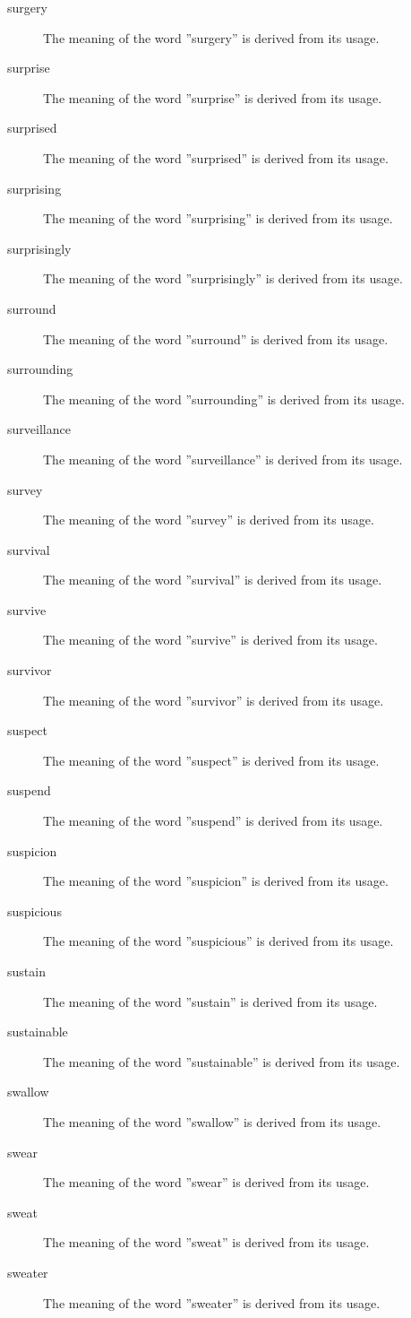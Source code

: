 \documentclass[12pt, letterpaper]{memoir}
\begin{document}
\begin{description}
\item[surgery] The meaning of the word ''surgery'' is derived from its usage.
\item[surprise] The meaning of the word ''surprise'' is derived from its usage.
\item[surprised] The meaning of the word ''surprised'' is derived from its usage.
\item[surprising] The meaning of the word ''surprising'' is derived from its usage.
\item[surprisingly] The meaning of the word ''surprisingly'' is derived from its usage.
\item[surround] The meaning of the word ''surround'' is derived from its usage.
\item[surrounding] The meaning of the word ''surrounding'' is derived from its usage.
\item[surveillance] The meaning of the word ''surveillance'' is derived from its usage.
\item[survey] The meaning of the word ''survey'' is derived from its usage.
\item[survival] The meaning of the word ''survival'' is derived from its usage.
\item[survive] The meaning of the word ''survive'' is derived from its usage.
\item[survivor] The meaning of the word ''survivor'' is derived from its usage.
\item[suspect] The meaning of the word ''suspect'' is derived from its usage.
\item[suspend] The meaning of the word ''suspend'' is derived from its usage.
\item[suspicion] The meaning of the word ''suspicion'' is derived from its usage.
\item[suspicious] The meaning of the word ''suspicious'' is derived from its usage.
\item[sustain] The meaning of the word ''sustain'' is derived from its usage.
\item[sustainable] The meaning of the word ''sustainable'' is derived from its usage.
\item[swallow] The meaning of the word ''swallow'' is derived from its usage.
\item[swear] The meaning of the word ''swear'' is derived from its usage.
\item[sweat] The meaning of the word ''sweat'' is derived from its usage.
\item[sweater] The meaning of the word ''sweater'' is derived from its usage.

\end{description}
\end{document}
